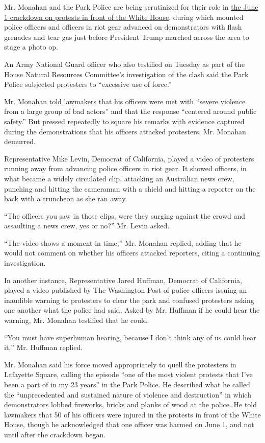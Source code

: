 Mr. Monahan and the Park Police are being scrutinized for their role in
\href{https://www.nytimes.com/2020/06/02/us/politics/trump-walk-lafayette-square.html?action=click\&module=RelatedLinks\&pgtype=Article}{the
June 1 crackdown on protests in front of the White House}, during which
mounted police officers and officers in riot gear advanced on
demonstrators with flash grenades and tear gas just before President
Trump marched across the area to stage a photo op.

An Army National Guard officer who also testified on Tuesday as part of
the House Natural Resources Committee's investigation of the clash said
the Park Police subjected protesters to ``excessive use of force.''

Mr. Monahan
\href{https://naturalresources.house.gov/download/written-testimony-gregory-monahan-fc-ov-hrg-072820-lafayette-square}{told
lawmakers} that his officers were met with ``severe violence from a
large group of bad actors'' and that the response ``centered around
public safety.'' But pressed repeatedly to square his remarks with
evidence captured during the demonstrations that his officers attacked
protesters, Mr. Monahan demurred.

Representative Mike Levin, Democrat of California, played a video of
protesters running away from advancing police officers in riot gear. It
showed officers, in what became a widely circulated clip, attacking an
Australian news crew, punching and hitting the cameraman with a shield
and hitting a reporter on the back with a truncheon as she ran away.

``The officers you saw in those clips, were they surging against the
crowd and assaulting a news crew, yes or no?'' Mr. Levin asked.

``The video shows a moment in time,'' Mr. Monahan replied, adding that
he would not comment on whether his officers attacked reporters, citing
a continuing investigation.

In another instance, Representative Jared Huffman, Democrat of
California, played a video published by The Washington Post of police
officers issuing an inaudible warning to protesters to clear the park
and confused protesters asking one another what the police had said.
Asked by Mr. Huffman if he could hear the warning, Mr. Monahan testified
that he could.

``You must have superhuman hearing, because I don't think any of us
could hear it,'' Mr. Huffman replied.

Mr. Monahan said his force moved appropriately to quell the protesters
in Lafayette Square, calling the episode ``one of the most violent
protests that I've been a part of in my 23 years'' in the Park Police.
He described what he called the ``unprecedented and sustained nature of
violence and destruction'' in which demonstrators lobbed fireworks,
bricks and planks of wood at the police. He told lawmakers that 50 of
his officers were injured in the protests in front of the White House,
though he acknowledged that one officer was harmed on June 1, and not
until after the crackdown began.

